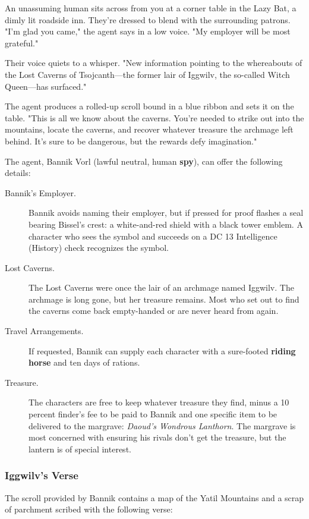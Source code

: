 \documentclass[10pt,a4paper,twoside,bg=print,twocolumn,openany,nodeprecatedcode]{dndbook}
\begin{document}
\begin{DndReadAloud}{}
An unassuming human sits across from you at a corner table in the Lazy Bat, a dimly lit roadside inn. They're dressed to blend with the surrounding patrons. "I'm glad you came," the agent says in a low voice. "My employer will be most grateful."

Their voice quiets to a whisper. "New information pointing to the whereabouts of the Lost Caverns of Tsojcanth—the former lair of Iggwilv, the so-called Witch Queen—has surfaced."

The agent produces a rolled-up scroll bound in a blue ribbon and sets it on the table. "This is all we know about the caverns. You're needed to strike out into the mountains, locate the caverns, and recover whatever treasure the archmage left behind. It's sure to be dangerous, but the rewards defy imagination."

\end{DndReadAloud}

The agent, Bannik Vorl (lawful neutral, human \textbf{spy}), can offer the following details:


\begin{description}
\item[Bannik's Employer.]
Bannik avoids naming their employer, but if pressed for proof flashes a seal bearing Bissel's crest: a white-and-red shield with a black tower emblem. A character who sees the symbol and succeeds on a DC 13 Intelligence (History) check recognizes the symbol.
\item[Lost Caverns.]
The Lost Caverns were once the lair of an archmage named Iggwilv. The archmage is long gone, but her treasure remains. Most who set out to find the caverns come back empty-handed or are never heard from again.
\item[Travel Arrangements.]
If requested, Bannik can supply each character with a sure-footed \textbf{riding horse} and ten days of rations.
\item[Treasure.]
The characters are free to keep whatever treasure they find, minus a 10 percent finder's fee to be paid to Bannik and one specific item to be delivered to the margrave: \textit{Daoud's Wondrous Lanthorn}. The margrave is most concerned with ensuring his rivals don't get the treasure, but the lantern is of special interest.
\end{description}

\subsubsection{Iggwilv's Verse}
The scroll provided by Bannik contains a map of the Yatil Mountains and a scrap of parchment scribed with the following verse:
\end{document}
